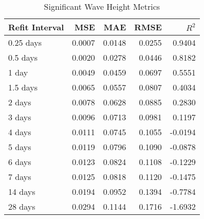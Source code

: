\label{Refits_hybrid_metrics}

\begin{table}[htbp]
    \centering
    \caption{Significant Wave Height Metrics}
    \label{tab:significant-wave-height}
    \begin{tabular}{|l|r|r|r|r|}
        \hline
        \textbf{Refit Interval} & \textbf{MSE} & \textbf{MAE} & \textbf{RMSE} & \textbf{\(R^2\)} \\
        \hline
        0.25 days & 0.0007 & 0.0148 & 0.0255 & 0.9404 \\
        0.5 days  & 0.0020 & 0.0278 & 0.0446 & 0.8182 \\
        1 day     & 0.0049 & 0.0459 & 0.0697 & 0.5551 \\
        1.5 days  & 0.0065 & 0.0557 & 0.0807 & 0.4034 \\
        2 days    & 0.0078 & 0.0628 & 0.0885 & 0.2830 \\
        3 days    & 0.0096 & 0.0713 & 0.0981 & 0.1197 \\
        4 days    & 0.0111 & 0.0745 & 0.1055 & -0.0194 \\
        5 days    & 0.0119 & 0.0796 & 0.1090 & -0.0878 \\
        6 days    & 0.0123 & 0.0824 & 0.1108 & -0.1229 \\
        7 days    & 0.0125 & 0.0818 & 0.1120 & -0.1475 \\
        14 days   & 0.0194 & 0.0952 & 0.1394 & -0.7784 \\
        28 days   & 0.0294 & 0.1144 & 0.1716 & -1.6932 \\
        \hline
    \end{tabular}
\end{table}

